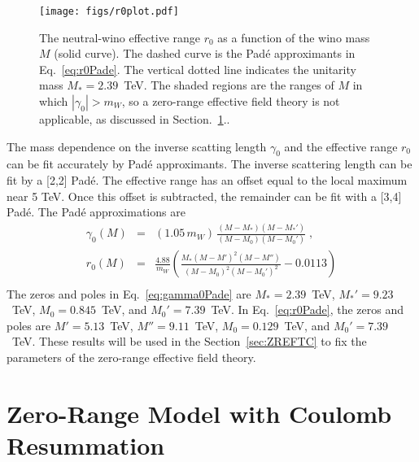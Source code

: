 \documentclass[%
 reprint,
 amsmath,amssymb,
 aps,
]{revtex4-1}
\begin{document}
\begin{figure}[t]
\centering
\texttt{[image: figs/r0plot.pdf]}
\caption{The neutral-wino effective range $r_0$ as a function of the wino mass $M$ (solid curve). 
The dashed curve is the Pad\'e approximants in Eq.~\eqref{eq:r0Pade}.
The vertical dotted line indicates the unitarity mass $M_* = 2.39$~TeV.
The shaded regions are the ranges of $M$ in which $|\gamma_0| > m_W$, so a zero-range effective field theory is not applicable, as discussed in Section.~\ref{sec:ZRMC}..
}
\label{fig:r0vsM}
\end{figure}

The mass dependence on the inverse scatting length $\gamma_0$ and the effective range $r_0$ can be fit accurately by Pad\'e approximants.
The inverse scattering length can be fit by a [2,2] Pad\'e.
The effective range has an offset equal to the local maximum near 5 TeV.
Once this offset is subtracted, the remainder can be fit with a [3,4] Pad\'e.
The Pad\'e approximations are
\begin{subequations}
\begin{eqnarray}
\gamma_0(M) &=& (1.05\, m_W) \, \frac{(M-M_*)(M-M_*')}{(M-M_0)(M-M_0')} \;,
\label{eq:gamma0Pade}
\\
r_0(M) &=& \frac{4.88}{m_W} \left( \frac{M_*(M-M')^2 (M-M'')}{(M-M_0)^2(M-M_0')^2} - 0.0113 \right)
\nonumber\\
\label{eq:r0Pade}
\end{eqnarray}%
\label{eq:gamma0r0Pades}%
\end{subequations}%
The zeros and poles in Eq.~\eqref{eq:gamma0Pade} are $M_*=2.39$~TeV, $M_*'=9.23$~TeV, $M_0=0.845$~TeV, and $M_0'=7.39$~TeV. 
In Eq.~\eqref{eq:r0Pade}, the zeros and poles are $M'=5.13$~TeV, $M''=9.11$~TeV, $M_0=0.129$~TeV, and $M_0'=7.39$~TeV. 
These results will be used in the Section~\ref{sec:ZREFTC} to fix the parameters of the zero-range effective field theory.

\section{Zero-Range Model with Coulomb Resummation}
\label{sec:ZRMC}
\end{document}
